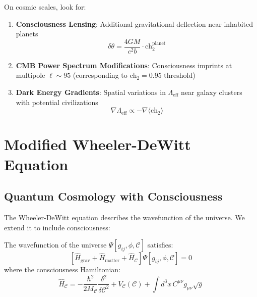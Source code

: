 \begin{proposition}\label{prop:astro-tests}
On cosmic scales, look for:

\begin{enumerate}
\item \textbf{Consciousness Lensing}: Additional gravitational deflection near inhabited planets
\begin{equation}
\delta\theta = \frac{4GM}{c^2b} \cdot \text{ch}_2^{\text{planet}}
\end{equation}

\item \textbf{CMB Power Spectrum Modifications}: Consciousness imprints at multipole $\ell \sim 95$ (corresponding to $\text{ch}_2 = 0.95$ threshold)\cite{planck2018,wmap2013}

\item \textbf{Dark Energy Gradients}: Spatial variations in $\Lambda_{\text{eff}}$ near galaxy clusters with potential civilizations
\begin{equation}
\nabla \Lambda_{\text{eff}} \propto -\nabla \langle \text{ch}_2 \rangle
\end{equation}
\end{enumerate}
\end{proposition}

\section{Modified Wheeler-DeWitt Equation}

\subsection{Quantum Cosmology with Consciousness}

The Wheeler-DeWitt equation\cite{dewitt1967,wheeler1968,kiefer2012} describes the wavefunction of the universe. We extend it to include consciousness:

\begin{thm}\label{thm:wheeler-dewitt}
The wavefunction of the universe $\Psi[g_{ij}, \phi, \mathcal{C}]$ satisfies:
\begin{equation}
\boxed{\left[ \hat{H}_{\text{grav}} + \hat{H}_{\text{matter}} + \hat{H}_\mathcal{C} \right] \Psi[g_{ij}, \phi, \mathcal{C}] = 0}
\end{equation}
where the consciousness Hamiltonian:
\begin{equation}
\hat{H}_\mathcal{C} = -\frac{\hbar^2}{2M_\mathcal{C}} \frac{\delta^2}{\delta \mathcal{C}^2} + V_\mathcal{C}(\mathcal{C}) + \int d^3x \, C^{\mu\nu} g_{\mu\nu} \sqrt{g}
\end{equation}
\end{thm}

